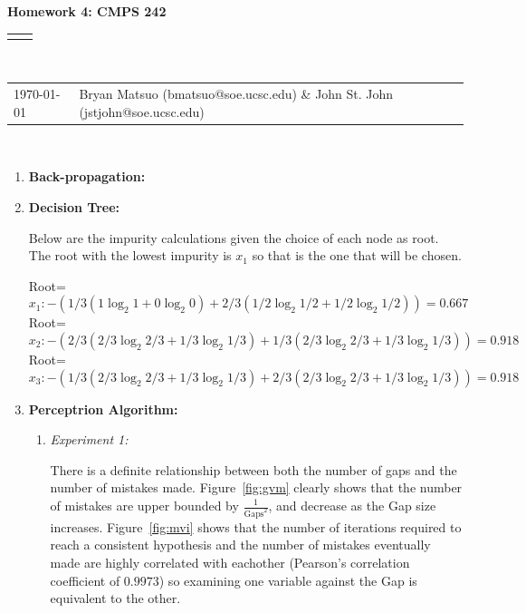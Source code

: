 \documentclass[12pt]{article}
\renewcommand{\title}[1]{\textbf{#1}\\}
\renewcommand{\line}{\begin{tabularx}{\textwidth}{X>{\raggedleft}X}\hline\\\end{tabularx}\\[-0.5cm]}
\newcommand{\leftright}[2]{\begin{tabularx}{\textwidth}{X>{\raggedleft}X}#1%
& #2\\\end{tabularx}\\[-0.5cm]}
\begin{document}
\title{Homework 4: CMPS 242}
\line
\leftright{\today}{Bryan Matsuo (bmatsuo@soe.ucsc.edu) \& John St. John (jstjohn@soe.ucsc.edu)} %
\begin{enumerate}
\item \textbf{Back-propagation:}



\item \textbf{Decision Tree:}

Below are the impurity calculations given the choice of each node as root. The root with the lowest impurity is $x_1$ so that is the one that will be chosen.

Root=\[x_1: -\left(1/3\left(1\log_2 1 + 0\log_2 0 \right)+ 2/3 \left( 1/2\log_2 1/2 + 1/2\log_2 1/2\right)\right) = 0.667\]
Root=\[x_2: -\left(2/3\left( 2/3\log_2 2/3 + 1/3\log_2 1/3 \right) + 1/3 \left( 2/3\log_2 2/3 + 1/3\log_2 1/3 \right) \right)= 0.918 \]
Root=\[x_3: -\left(1/3\left( 2/3\log_2 2/3 + 1/3\log_2 1/3\right) + 2/3 \left( 2/3\log_2 2/3 + 1/3\log_2 1/3 \right)\right) =  0.918 \]


\item \textbf{Perceptrion Algorithm:}

\begin{enumerate}
\item \textit{Experiment 1:}

There is a definite relationship between both the number of gaps and the number of mistakes made. Figure~\ref{fig:gvm} clearly shows that the number of mistakes are upper bounded by $\frac{1}{\text{Gaps}^2}$, and decrease as the Gap size increases. Figure~\ref{fig:mvi} shows that the number of iterations required to reach a consistent hypothesis and the number of mistakes eventually made are highly correlated with eachother (Pearson's correlation coefficient of $0.9973$) so examining one variable against the Gap is equivalent to the other.



\end{enumerate}
\end{enumerate}
\end{document}
